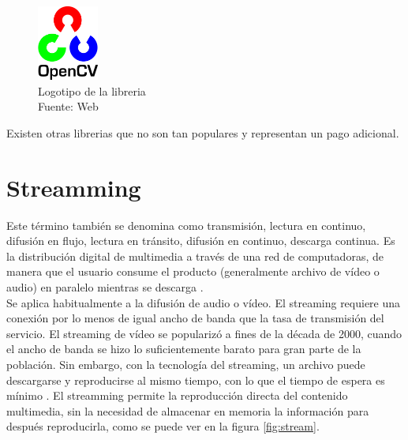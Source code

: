 \begin{figure}[H]
    \begin{center}
        \includegraphics[width=2cm]{img/capitulo_2/cv2_logo.png}
    \end{center}
    \caption{Logotipo de la libreria\\Fuente: Web}
    \label{fig:cv2_logo}
\end{figure}


Existen otras librerias que no son tan populares y representan un pago adicional.

\section{Streamming}
Este término también se denomina como transmisión, lectura en continuo, difusión en flujo, lectura en tránsito, difusión en continuo, descarga continua. Es la distribución digital de multimedia a través de una red de computadoras, de manera que el usuario consume el producto (generalmente archivo de vídeo o audio) en paralelo mientras se descarga \cite{streamming:austerberry}.\\

Se aplica habitualmente a la difusión de audio o vídeo. El streaming requiere una conexión por lo menos de igual ancho de banda que la tasa de transmisión del servicio. El streaming de vídeo se popularizó a fines de la década de 2000, cuando el ancho de banda se hizo lo suficientemente barato para gran parte de la población. Sin embargo, con la tecnología del streaming, un archivo puede descargarse y reproducirse al mismo tiempo, con lo que el tiempo de espera es mínimo \cite{streamming:austerberry}. El streamming permite la reproducción directa del contenido multimedia, sin la necesidad de almacenar en memoria la información para después reproducirla, como se puede ver en la figura \ref{fig:stream}.\\

